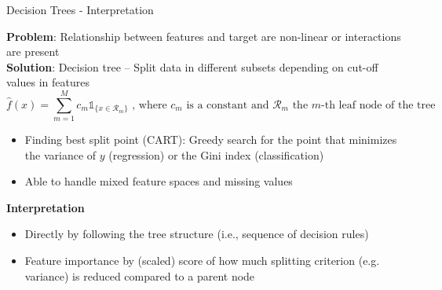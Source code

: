 \documentclass[11pt,compress,t,notes=noshow, aspectratio=169, xcolor=table]{beamer}
\begin{document}

\begin{frame}{Decision Trees - Interpretation}

\textbf{Problem}: Relationship between features and target are non-linear or interactions are present\\
\medskip
\pause
\textbf{Solution}: Decision tree  -- Split data in different subsets depending on cut-off values in features 
$$
\hat f(x) = \sum_{m=1}^M c_m \mathds{1}_{\{x \in \mathcal{R}_m\}}\text{ ,  where $c_m$ is a constant and $\mathcal{R}_m$ the $m$-th leaf node of the tree}
$$

\begin{itemize}
    \item Finding best split point (CART): Greedy search for the point that minimizes the variance of $y$ (regression) or the Gini index (classification)
    \item Able to handle mixed feature spaces and missing values
\end{itemize}
\medskip
\pause
\textbf{Interpretation}
\begin{itemize}
    \item Directly by following the tree structure (i.e., sequence of decision rules)
    \item Feature importance by (scaled) score of how much splitting criterion (e.g. variance) is reduced compared to a parent node
\end{itemize}



\end{frame}
\end{document}
